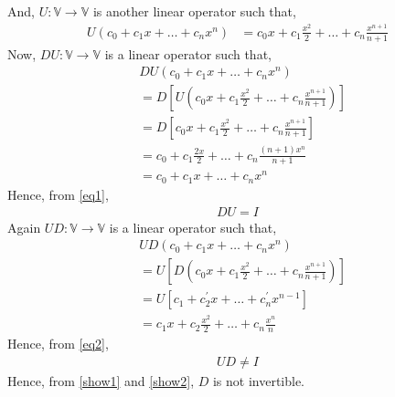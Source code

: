 \documentclass[journal,12pt,twocolumn]{IEEEtran}
\begin{document}
And, $U:\mathbb{V} \xrightarrow{} \mathbb{V}$ is another linear operator such that,
\begin{align}
U(c_0+c_1x+\dots+c_nx^n) &= c_0x+c_1\frac{x^2}{2}+\dots+c_n\frac{x^{n+1}}{n+1}
\end{align}
Now, $DU:\mathbb{V} \xrightarrow{} \mathbb{V}$ is a linear operator such that,
\begin{align}
&DU(c_0+c_1x+\dots+c_nx^n) \\
&= D[U(c_0x+c_1\frac{x^2}{2}+\dots+c_n\frac{x^{n+1}}{n+1})]\\
&= D[c_0x+c_1\frac{x^2}{2}+\dots+c_n\frac{x^{n+1}}{n+1}]\\
&= c_0+c_1\frac{2x}{2}+\dots+c_n\frac{(n+1)x^{n}}{n+1}\\
&= c_0+c_1x+\dots+c_nx^n\label{eq1}
\end{align}
Hence, from \eqref{eq1},
\begin{align}
DU = I\label{show1}
\end{align}
Again $UD:\mathbb{V} \xrightarrow{} \mathbb{V}$ is a linear operator such that,
\begin{align}
&UD(c_0+c_1x+\dots+c_nx^n) \\
&= U[D(c_0x+c_1\frac{x^2}{2}+\dots+c_n\frac{x^{n+1}}{n+1})]\\
&= U[c_1+c^{\prime}_2x+\dots+c^{\prime}_nx^{n-1}]\\
&= c_1x+c_2\frac{x^2}{2}+\dots+c_n\frac{x^{n}}{n}\label{eq2}\
\end{align}
Hence, from \eqref{eq2},
\begin{align}
UD \ne I\label{show2}
\end{align}
Hence, from \eqref{show1} and \eqref{show2}, $D$ is not invertible.
\end{document}
